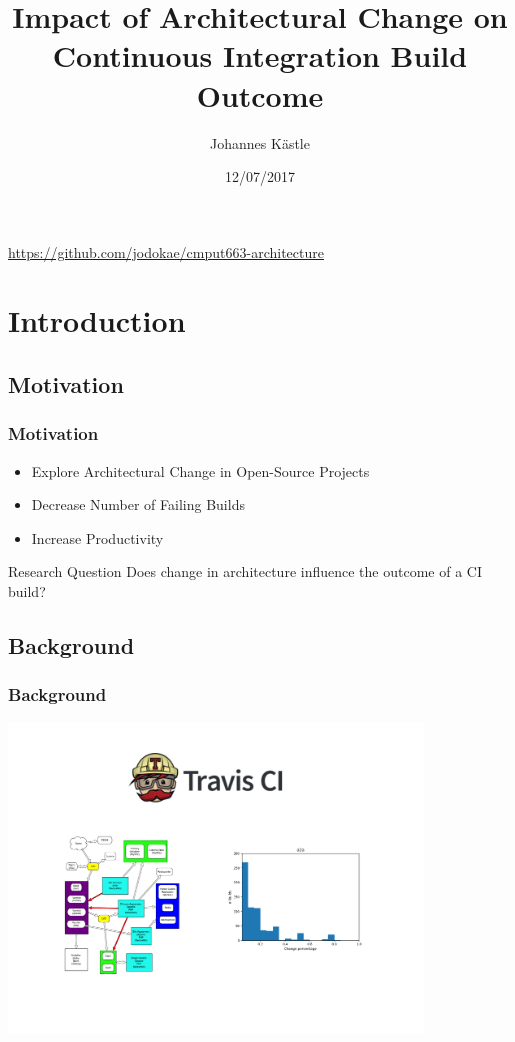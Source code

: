 \documentclass{beamer}
\title[Architectural Change in CI Builds]{Impact of Architectural Change on Continuous Integration Build Outcome}
\author{Johannes K{\"a}stle}
\institute{University of Alberta}
\date{12/07/2017}
\begin{document}
\begin{frame}
	\titlepage
	
	\begin{center}
		\url{https://github.com/jodokae/cmput663-architecture}
	\end{center}
\end{frame}

\section{Introduction}
\subsection{Motivation}
\begin{frame}
\frametitle{Motivation}

\begin{itemize}
	\item Explore Architectural Change in Open-Source Projects
	\item Decrease Number of Failing Builds
	\item Increase Productivity
\end{itemize}

\pause

\begin{block}{Research Question}
Does change in architecture influence the outcome of a CI build?
\end{block}

\end{frame}


\subsection{Background}
\begin{frame}
\frametitle{Background}

\includegraphics[width=11cm]{assets/Background.pdf}

\end{frame}
\end{document}
